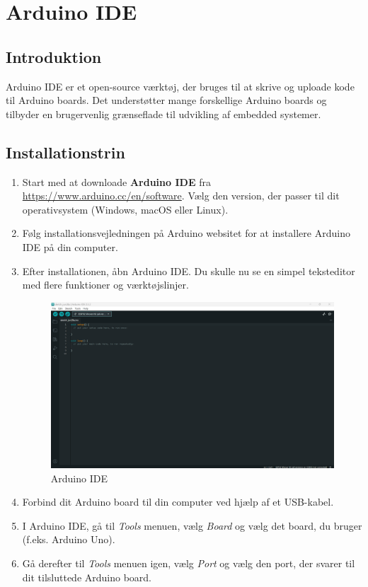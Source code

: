 \section{Arduino IDE}
\subsection{Introduktion}
Arduino IDE er et open-source værktøj, der bruges til at skrive og uploade kode til Arduino boards. Det understøtter mange forskellige Arduino boards og tilbyder en brugervenlig grænseflade til udvikling af embedded systemer.

\subsection{Installationstrin}
\begin{enumerate}
	\item Start med at downloade \textbf{Arduino IDE} fra \url{https://www.arduino.cc/en/software}. Vælg den version, der passer til dit operativsystem (Windows, macOS eller Linux).
	\item Følg installationsvejledningen på Arduino websitet for at installere Arduino IDE på din computer.
	\item Efter installationen, åbn Arduino IDE. Du skulle nu se en simpel teksteditor med flere funktioner og værktøjslinjer.
	\begin{figure}[!h]
		\centering
		\includegraphics[width=\textwidth]{fig/fig23.png}
		\caption{Arduino IDE}
	\end{figure}
	\item Forbind dit Arduino board til din computer ved hjælp af et USB-kabel.
	\item I Arduino IDE, gå til \textit{Tools} menuen, vælg \textit{Board} og vælg det board, du bruger (f.eks. Arduino Uno).
	\item Gå derefter til \textit{Tools} menuen igen, vælg \textit{Port} og vælg den port, der svarer til dit tilsluttede Arduino board.
\end{enumerate}

